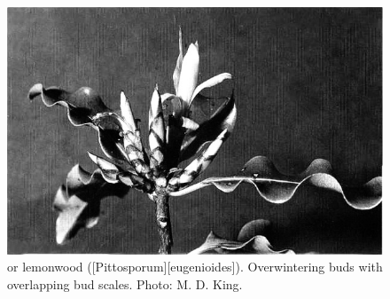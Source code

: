 \begin{figure}[t]
	\begin{minipage}[t]{\textwidth}
		\begin{minipage}[t]{(\textwidth-\fgap) * \real{0.677}}
			\centering
			\includegraphics[width=\textwidth]{graphics/figure24tarata.jpg}
			\caption[Tarata or lemonwood]{ or lemonwood ([Pittosporum][eugenioides]). Overwintering buds with overlapping bud scales. Photo: M. D. King.}%
			\label{fig:24tarata}
		\end{minipage}\hspace{\fgap}%
		\begin{minipage}[t]{(\textwidth-\fgap) * \real{0.323}}
			\centering

\end{minipage}
\end{minipage}
\end{figure}
